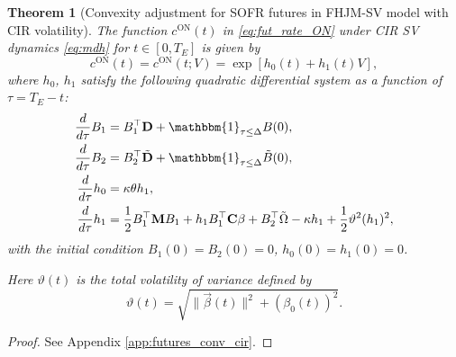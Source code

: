 \documentclass[pdftex,11pt,a4paper] {article}
\newtheorem{theorem}{Theorem}[section]
\begin{document}
\begin{theorem}[Convexity adjustment for SOFR futures in FHJM-SV model with CIR volatility]\label{thm:futures_conv_cir}
The function $c^{\mathrm{ON}}(t)$ in \eqref{eq:fut_rate_ON} under CIR SV dynamics \eqref{eq:mdh} for $t\in[0, T_E]$ is given by
\begin{equation}\label{eq:convexity_ae_ord1_lead_cir}
c^{\mathrm{ON}}(t)=c^{\mathrm{ON}}(t;V)=\exp\left[h_0(t)+h_1(t)V\right],
\end{equation}
where $h_0$, $h_1$ satisfy the following quadratic differential system as a function of $\tau=T_E-t$:
\begin{equation}\label{eq:MF_conv_adj_ODE_cir}
\begin{split}
\frac{d}{d\tau}B_1&=B_1^\top \mathbf{D}+\mathbbm{1}_{\tau\le \Delta}B(0),\\
\frac{d}{d\tau}B_2&=B_2^\top \tilde{\mathbf{D}}+\mathbbm{1}_{\tau\le \Delta}\tilde B(0),\\
\frac{d}{d\tau}h_0&=\kappa\theta h_1,\\
\frac{d}{d\tau}h_1&=\frac{1}{2}B_1^\top\mathbf{M}B_1+h_1B_1^\top\mathbf{C}\beta+B_2^\top\tilde{\Omega}-\kappa h_1+\frac{1}{2}\vartheta^2 (h_1)^2,
\end{split}
\end{equation}
with the initial condition $B_1(0)=B_2(0)=0$, $h_0(0)=h_1(0)=0$.

Here $\vartheta(t)$ is the total volatility of variance defined by
\begin{equation*}
\vartheta(t)=\sqrt{\|\vec{\beta}(t)\|^2+(\beta_0(t))^2}.
\end{equation*}
\end{theorem}
\begin{proof}
See Appendix \ref{app:futures_conv_cir}.
\end{proof}
\end{document}
